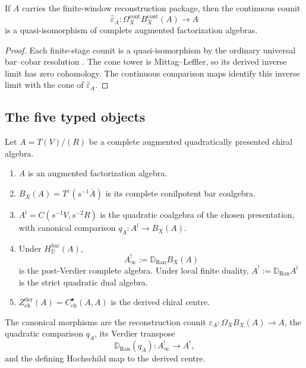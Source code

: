 \begin{proposition}
\label{prop:finite-window-ml-inversion-bci}
If \(A\) carries the finite-window reconstruction package, then the
continuous counit
\[
\widehat\varepsilon_A\colon
\Omega_X^{\mathrm{cont}}B_X^{\mathrm{cont}}(A)\longrightarrow A
\]
is a quasi-isomorphism of complete augmented factorization algebras.
\end{proposition}

\begin{proof}
Each finite-stage counit is a quasi-isomorphism by the ordinary
universal bar--cobar resolution
\cite[Corollary~2.3.4]{LV12}.  The cone tower is
Mittag--Leffler, so its derived inverse limit has zero cohomology.
The continuous comparison maps identify this inverse limit with the
cone of \(\widehat\varepsilon_A\).
\end{proof}

\subsection{The five typed objects}

\begin{proposition}
\label{prop:bar-cobar-object-firewall-bci}
Let \(A=T(V)/(R)\) be a complete augmented quadratically presented
chiral algebra.
\begin{enumerate}[label=\textup{(\roman*)}]
\item \(A\) is an augmented factorization algebra.
\item \(B_X(A)=T^c(s^{-1}\bar A)\) is its complete conilpotent
bar coalgebra.
\item \(A^{\mathrm i}=C(s^{-1}V,s^{-2}R)\) is the quadratic coalgebra of the
chosen presentation, with canonical comparison
\(q_A\colon A^{\mathrm i}\to B_X(A)\).
\item Under \(H_{\mathbb D}^{\mathrm{bar}}(A)\),
\[
A^!_\infty:=\mathbb D_{\operatorname{Ran}}B_X(A)
\]
is the post-Verdier complete algebra.  Under local finite duality,
\(A^!:=\mathbb D_{\operatorname{Ran}}A^{\mathrm i}\) is the strict
quadratic dual algebra.
\item
\(Z^{\mathrm{der}}_{\mathrm{ch}}(A)
=C^\bullet_{\mathrm{ch}}(A,A)\)
is the derived chiral centre.
\end{enumerate}
The canonical morphisms are the reconstruction counit
\(\varepsilon_A\colon\Omega_XB_X(A)\to A\), the quadratic comparison
\(q_A\), its Verdier transpose
\[
\mathbb D_{\operatorname{Ran}}(q_A)\colon
A^!_\infty\longrightarrow A^!,
\]
and the defining Hochschild map to the derived centre.
\end{proposition}

